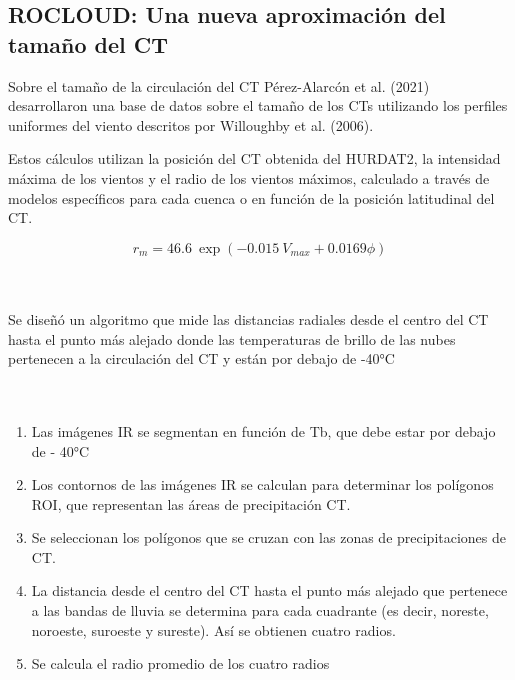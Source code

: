 \subsection{ROCLOUD: Una nueva aproximación del tamaño del CT}
\begin{frame}
    \begin{block}{Sobre el tamaño de la circulación del CT}
        Pérez-Alarcón et al. (2021) desarrollaron una base de datos sobre el tamaño de los CTs utilizando los perfiles uniformes del viento descritos por Willoughby et al. (2006). \bigskip

        Estos cálculos utilizan la posición del CT obtenida del HURDAT2, la intensidad máxima de los vientos y el radio de los vientos máximos, calculado a través de modelos específicos para cada cuenca o en función de la posición latitudinal del CT.

    \begin{equation}
        \label{eq:2.1}
        r_{m} =  46.6 \ \exp{(-0.015 \ V_{max} + 0.0169 \phi)}
    \end{equation}
        \\~\
    \end{block}

\end{frame}

\begin{frame}
    Se diseñó un algoritmo que mide las distancias radiales desde el centro del CT hasta el punto más alejado donde las temperaturas de brillo de las nubes pertenecen a la circulación del CT y están por debajo de -40°C
    \\~\ 
    \\~\ 
\begin{enumerate}
    \item<1-> Las imágenes IR se segmentan en función de Tb, que debe estar por debajo de - 40°C
    \item<2-> Los contornos de las imágenes IR se calculan para determinar los polígonos ROI, que representan las áreas de precipitación CT.
    \item<3-> Se seleccionan los polígonos que se cruzan con las zonas de precipitaciones de CT.
    \item<4-> La distancia desde el centro del CT hasta el punto más alejado que pertenece a las bandas de lluvia se determina para cada cuadrante (es decir, noreste, noroeste, suroeste y sureste). Así se obtienen cuatro radios.
    \item<4-> Se calcula el radio promedio de los cuatro radios
\end{enumerate}
\end{frame}


